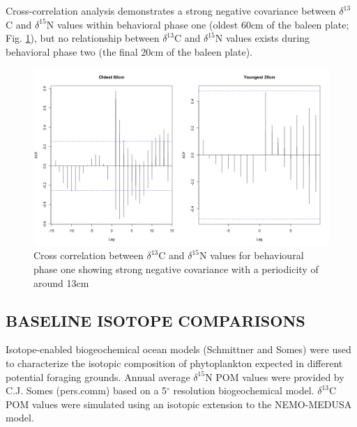 \documentclass[a4paper,12pt]{article}
\begin{document}
Cross-correlation analysis demonstrates a strong negative covariance between $\delta^{13}$C and $\delta^{15}$N values within behavioral phase one (oldest 60cm of the baleen plate; Fig. \ref{figs2}), but no relationship between $\delta^{13}$C and $\delta^{15}$N values exists during behavioral phase two (the final 20cm of the baleen plate). 

\begin{figure}[!htbp]
  \centering
  \includegraphics[width = \linewidth]{figures/Figure-S2-cross-cor.png}
  \caption{Cross correlation between $\delta^{13}$C and $\delta^{15}$N values for behavioural phase one showing strong negative covariance with a periodicity of around 13cm} %
  \label{figs2}
\end{figure}
 
\subsection*{BASELINE ISOTOPE COMPARISONS}
Isotope-enabled biogeochemical ocean models\cite{magozzi2017using} (Schmittner and Somes) were used to characterize the isotopic composition of phytoplankton expected in different potential foraging grounds. 
Annual average $\delta^{15}$N POM values were provided by C.J. Somes (pers.comm) based on a 5$^{\circ}$ resolution biogeochemical model. 
$\delta^{13}$C POM values were simulated using an isotopic extension to the NEMO-MEDUSA model\cite{magozzi2017using}.
 
\end{document}
